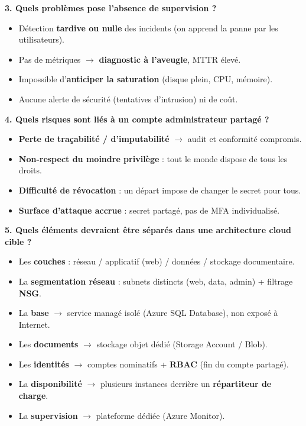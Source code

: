 \documentclass[11pt,a4paper]{article}
\newcommand{\arr}{\ensuremath{\rightarrow}}
\begin{document}
\textbf{3. Quels problèmes pose l'absence de supervision ?}
\begin{itemize}
  \item Détection \textbf{tardive ou nulle} des incidents (on apprend la panne par les utilisateurs).
  \item Pas de métriques \arr{} \textbf{diagnostic à l'aveugle}, MTTR élevé.
  \item Impossible d'\textbf{anticiper la saturation} (disque plein, CPU, mémoire).
  \item Aucune alerte de sécurité (tentatives d'intrusion) ni de coût.
\end{itemize}

\textbf{4. Quels risques sont liés à un compte administrateur partagé ?}
\begin{itemize}
  \item \textbf{Perte de traçabilité / d'imputabilité} \arr{} audit et conformité compromis.
  \item \textbf{Non-respect du moindre privilège} : tout le monde dispose de tous les droits.
  \item \textbf{Difficulté de révocation} : un départ impose de changer le secret pour tous.
  \item \textbf{Surface d'attaque accrue} : secret partagé, pas de MFA individualisé.
\end{itemize}

\textbf{5. Quels éléments devraient être séparés dans une architecture cloud cible ?}
\begin{itemize}
  \item Les \textbf{couches} : réseau / applicatif (web) / données / stockage documentaire.
  \item La \textbf{segmentation réseau} : subnets distincts (web, data, admin) + filtrage \textbf{NSG}.
  \item La \textbf{base} \arr{} service managé isolé (Azure SQL Database), non exposé à Internet.
  \item Les \textbf{documents} \arr{} stockage objet dédié (Storage Account / Blob).
  \item Les \textbf{identités} \arr{} comptes nominatifs + \textbf{RBAC} (fin du compte partagé).
  \item La \textbf{disponibilité} \arr{} plusieurs instances derrière un \textbf{répartiteur de charge}.
  \item La \textbf{supervision} \arr{} plateforme dédiée (Azure Monitor).
\end{itemize}
\end{document}
